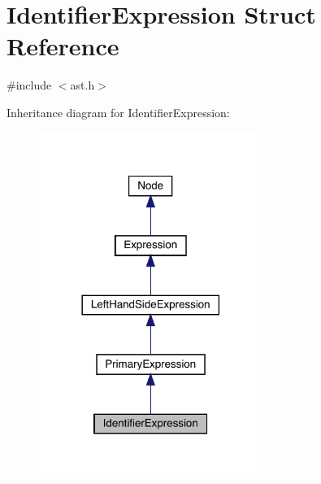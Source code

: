 \hypertarget{struct_identifier_expression}{}\section{Identifier\+Expression Struct Reference}
\label{struct_identifier_expression}


{\ttfamily \#include $<$ast.\+h$>$}



Inheritance diagram for Identifier\+Expression\+:\nopagebreak
\begin{figure}[H]
\begin{center}
\leavevmode
\includegraphics[width=206pt]{struct_identifier_expression__inherit__graph}
\end{center}
\end{figure}



